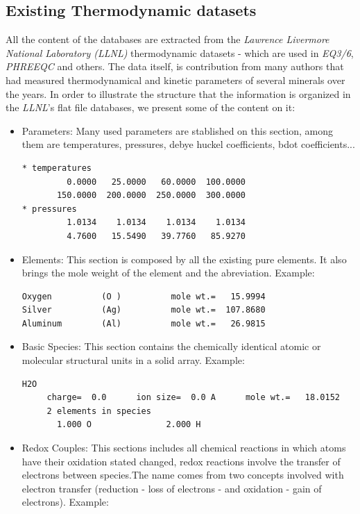 \subsection{Existing Thermodynamic datasets}
All the content of the databases are extracted from the \emph{Lawrence Livermore National Laboratory (LLNL)} thermodynamic datasets - which are used in \emph{EQ3/6}, \emph{PHREEQC} and others. The data itself, is contribution from many authors that had measured thermodynamical and kinetic parameters of several minerals over the years. In order to illustrate the structure that the information is organized in the \emph{LLNL}'s flat file databases, we present some of the content on it:

\begin{itemize}
\item Parameters: Many used parameters are stablished on this section, among them are temperatures, pressures, debye huckel coefficients, bdot coefficients...
\begin{lstlisting}[frame=single, caption=Excerpt of the section Parameters]
* temperatures
         0.0000   25.0000   60.0000  100.0000
       150.0000  200.0000  250.0000  300.0000
* pressures
         1.0134    1.0134    1.0134    1.0134
         4.7600   15.5490   39.7760   85.9270
\end{lstlisting}
\item Elements: This section is composed by all the existing pure elements. It also brings the mole weight of the element and the abreviation. Example: 
\begin{lstlisting}[frame=single, caption=Excerpt of the section Elements]
Oxygen          (O )          mole wt.=   15.9994
Silver          (Ag)          mole wt.=  107.8680
Aluminum        (Al)          mole wt.=   26.9815
\end{lstlisting}
\item Basic Species: This section contains the chemically identical atomic or molecular structural units in a solid array. Example:
\begin{lstlisting}[frame=single, caption=Excerpt of the section Basic Species]
H2O
     charge=  0.0      ion size=  0.0 A      mole wt.=   18.0152
     2 elements in species
       1.000 O               2.000 H
\end{lstlisting}

\item Redox Couples: This sections includes all chemical reactions in which atoms have their oxidation stated changed, redox reactions involve the transfer of electrons between species.The name comes from two concepts involved with electron transfer (reduction - loss of electrons - and oxidation - gain of electrons). Example:


\end{itemize}
